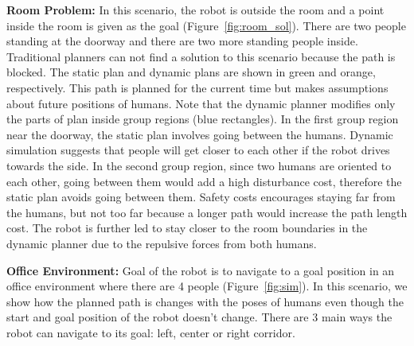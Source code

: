 \textbf{Room Problem: } In this scenario, the robot is outside the room and a point inside the room is given as the goal (Figure~\ref{fig:room_sol}). There are two people standing at the doorway and there are two more standing people inside. Traditional planners can not find a solution to this scenario because the path is blocked. The static plan and dynamic plans are shown in green and orange, respectively. This path is planned for the current time but makes assumptions about future positions of humans. Note that the dynamic planner modifies only the parts of plan inside group regions (blue rectangles). In the first group region near the doorway, the static plan involves going between the humans. Dynamic simulation suggests that people will get closer to each other if the robot drives towards the side. In the second group region, since two humans are oriented to each other, going between them would add a high disturbance cost, therefore the static plan avoids going between them. Safety costs encourages staying far from the humans, but not too far because a longer path would increase the path length cost. The robot is further led to stay closer to the room boundaries in the dynamic planner due to the repulsive forces from both humans.

\textbf{Office Environment: } Goal of the robot is to navigate to a goal position in an office environment where there are 4 people (Figure~\ref{fig:sim}). In this scenario, we show how the planned path is changes with the poses of humans even though the start and goal position of the robot doesn't change. There are 3 main ways the robot can navigate to its goal: left, center or right corridor. 

